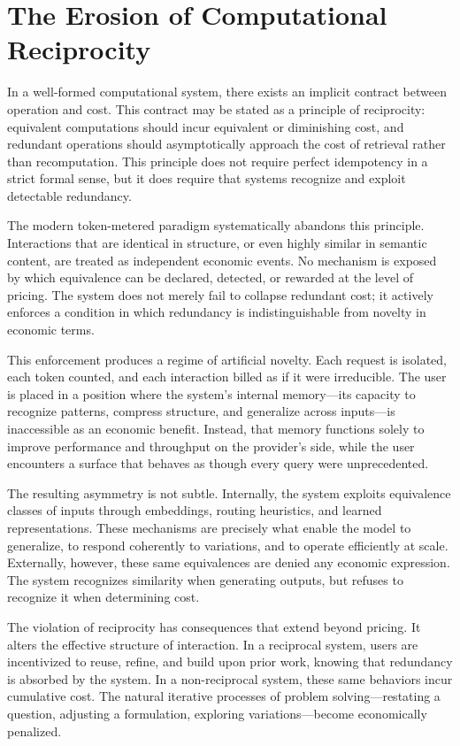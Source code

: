 \documentclass[12pt, oneside]{article}
\begin{document}
\section{The Erosion of Computational Reciprocity}

In a well-formed computational system, there exists an implicit contract between operation and cost. This contract may be stated as a principle of reciprocity: equivalent computations should incur equivalent or diminishing cost, and redundant operations should asymptotically approach the cost of retrieval rather than recomputation. This principle does not require perfect idempotency in a strict formal sense, but it does require that systems recognize and exploit detectable redundancy.

The modern token-metered paradigm systematically abandons this principle. Interactions that are identical in structure, or even highly similar in semantic content, are treated as independent economic events. No mechanism is exposed by which equivalence can be declared, detected, or rewarded at the level of pricing. The system does not merely fail to collapse redundant cost; it actively enforces a condition in which redundancy is indistinguishable from novelty in economic terms.

This enforcement produces a regime of artificial novelty. Each request is isolated, each token counted, and each interaction billed as if it were irreducible. The user is placed in a position where the system’s internal memory—its capacity to recognize patterns, compress structure, and generalize across inputs—is inaccessible as an economic benefit. Instead, that memory functions solely to improve performance and throughput on the provider’s side, while the user encounters a surface that behaves as though every query were unprecedented.

The resulting asymmetry is not subtle. Internally, the system exploits equivalence classes of inputs through embeddings, routing heuristics, and learned representations. These mechanisms are precisely what enable the model to generalize, to respond coherently to variations, and to operate efficiently at scale. Externally, however, these same equivalences are denied any economic expression. The system recognizes similarity when generating outputs, but refuses to recognize it when determining cost.

The violation of reciprocity has consequences that extend beyond pricing. It alters the effective structure of interaction. In a reciprocal system, users are incentivized to reuse, refine, and build upon prior work, knowing that redundancy is absorbed by the system. In a non-reciprocal system, these same behaviors incur cumulative cost. The natural iterative processes of problem solving—restating a question, adjusting a formulation, exploring variations—become economically penalized.
\end{document}
